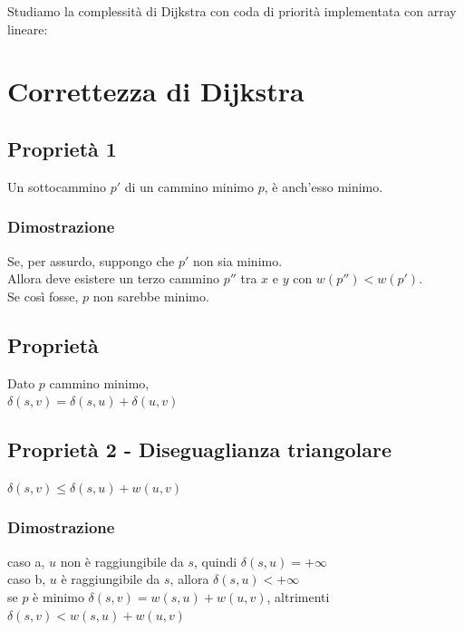 \documentclass{article}
\begin{document}
{{Studiamo la complessità di Dijkstra con coda di priorità implementata con array lineare:}

\section{Correttezza di Dijkstra}

\subsection{Proprietà 1}

Un sottocammino $p'$ di un cammino minimo $p$, è anch'esso minimo.

\subsubsection{Dimostrazione}

Se, per assurdo, suppongo che $p'$ non sia minimo.\\
Allora deve esistere un terzo cammino $p''$ tra $x$ e $y$ con $w(p'') < w(p')$.\\
Se così fosse, $p$ non sarebbe minimo.

\subsection{Proprietà}

Dato $p$ cammino minimo, \\
$\delta(s,v)=\delta(s,u)+\delta(u,v)$ \\


\subsection{Proprietà 2 - Diseguaglianza triangolare}

$\delta(s,v)\leq \delta(s,u)+w(u,v)$ \\

\subsubsection{Dimostrazione}

caso a, $u$ non è raggiungibile da $s$, quindi $\delta(s,u) = +\infty$ \\
caso b, $u$ è raggiungibile da $s$, allora $\delta(s,u) < +\infty$ \\

se $p$ è minimo $\delta(s,v)=w(s,u)+w(u,v)$, altrimenti $\delta(s,v)<w(s,u)+w(u,v)$ \\


}
\end{document}
